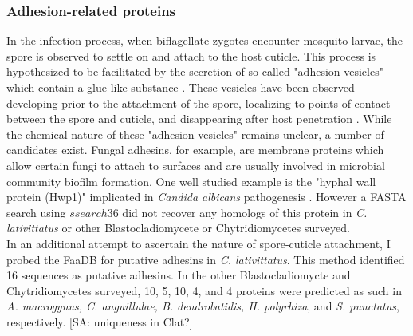 \subsubsection*{Adhesion-related proteins}
In the infection process, when biflagellate zygotes encounter mosquito larvae, the spore is observed to settle on and attach to the host cuticle. This process is hypothesized to be facilitated by the secretion of so-called "adhesion vesicles" which contain a glue-like substance \cite{Travland1979}. These vesicles have been observed developing prior to the attachment of the spore, localizing to points of contact between the spore and cuticle, and disappearing after host penetration \cite{Travland1979}. While the chemical nature of these "adhesion vesicles" remains unclear, a number of candidates exist. Fungal adhesins, for example, are membrane proteins which allow certain fungi to attach to surfaces and are usually involved in microbial community biofilm formation. One well studied example is the "hyphal wall protein (Hwp1)" implicated in \textit{Candida albicans} pathogenesis \cite{Staab1999}. However a FASTA search using $ssearch36$ did not recover any homologs of this protein in \textit{C. lativittatus} or other Blastocladiomycete or Chytridiomycetes surveyed.\\ 
\indent In an additional attempt to ascertain the nature of spore-cuticle attachment, I probed the FaaDB for putative adhesins in \textit{C. lativittatus}. This method identified 16 sequences as putative adhesins. In the other Blastocladiomycte and Chytridiomycetes surveyed, 10, 5, 10, 4, and 4 proteins were predicted as such in \textit{A. macrogynus, C. anguillulae, B. dendrobatidis, H. polyrhiza}, and \textit{S. punctatus}, respectively. [SA: uniqueness in Clat?]\\ 
